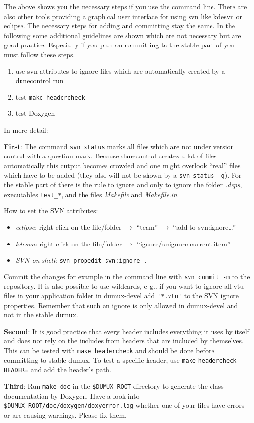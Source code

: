 The above shows you the necessary steps if you use the command line. There are also other tools providing a graphical 
user interface for using svn like kdesvn or eclipse. The necessary steps for adding and committing stay the same.
In the following some additional guidelines are shown which are not necessary but are good practice.
Especially if you plan on committing to the stable part of \Dumux you must follow these steps.

\begin{enumerate}[1)]
 \item use svn attributes to ignore files which are automatically created by a dunecontrol run
 \item test \texttt{make headercheck}
 \item test Doxygen
\end{enumerate}

\noindent In more detail:

\textbf{First}: The command \verb+svn status+ marks all files which are not under version control with a question mark. Because dunecontrol creates a lot of files automatically this output becomes crowded and one might overlook ``real'' files which have to be added (they also will not be shown by a \verb+svn status -q+).
For the stable part of \Dumux there is the rule to ignore and only to ignore the folder {\em .deps}, executables \texttt{test\_*}, and the files {\em Makefile} and {\em Makefile.in}.

How to set the SVN attributes:
\begin{itemize}
 \item{\em eclipse}: right click on the file/folder $\rightarrow$ ``team'' $\rightarrow$ ``add to svn:ignore\dots''
 \item{\em kdesvn}: right click on the file/folder $\rightarrow$ ``ignore/unignore current item''
 \item{\em SVN on shell}: \verb+svn propedit svn:ignore .+
\end{itemize}
Commit the changes for example in the command line with \verb+svn commit -m+ to the repository. It is also possible to use wildcards, e.\,g., if you want to ignore all vtu-files in your application folder in dumux-devel add \verb+'*.vtu'+ to the SVN ignore properties. Remember that such an ignore is only allowed in dumux-devel and not in the stable dumux.

\textbf{Second}: It is good practice that every header includes everything it uses by itself and does not rely on the includes from headers that are included by themselves. This can be tested with \texttt{make headercheck} and should be done before committing to stable dumux. To test a specific header, use \texttt{make} \texttt{headercheck} \texttt{HEADER=} and add the header's path.

\textbf{Third}: Run \texttt{make doc} in the \texttt{\$DUMUX\_ROOT} directory to generate the class documentation by Doxygen. Have a look into \texttt{\$DUMUX\_ROOT/doc/doxygen/doxyerror.log} whether one of your files have errors or are causing warnings. Please fix them.
